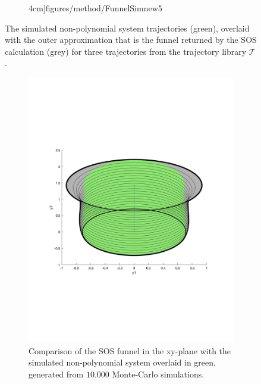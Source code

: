 \begin{figure}
\begin{subfigure}[c]{0.3\textwidth}
{      4cm}]{figures/method/FunnelSimnew5}
  \end{subfigure}
  \caption[A visualization of the simulated and the calculated reachable set]{The simulated non-polynomial system trajectories (green), overlaid
    with the outer approximation that is the funnel returned by the \ac{SOS}
    calculation (grey) for three trajectories from the trajectory library
    \(\mathcal{T}\).}
  \label{fig:funnel-simulated-overlaid}
\end{figure}

\begin{figure}
  \begin{subfigure}{0.5\textwidth}
    \includegraphics[trim={0cm 6cm 0cm 6cm},
    width=.95\textwidth]{figures/method/FunnelSim1}
    \caption{Comparison of the \ac{SOS} funnel in the xy-plane with the
      simulated non-polynomial system overlaid in green, generated from
      \(10.000\) Monte-Carlo simulations.}
  \end{subfigure}%
  \quad
  \begin{subfigure}{0.5\textwidth}

\end{subfigure}
\end{figure}
